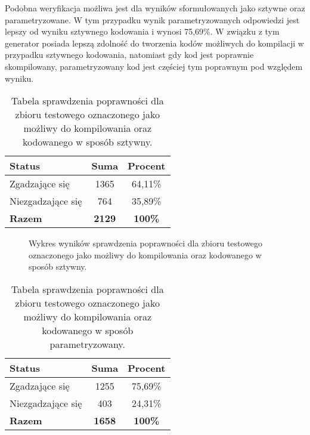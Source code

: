 Podobna weryfikacja możliwa jest dla wyników sformułowanych jako sztywne oraz parametryzowane. W tym przypadku wynik parametryzowanych odpowiedzi jest lepszy od wyniku sztywnego kodowania i wynosi 75,69\%. W związku z tym generator posiada lepszą zdolność do tworzenia kodów możliwych do kompilacji w przypadku sztywnego kodowania, natomiast gdy kod jest poprawnie skompilowany, parametryzowany kod jest częściej tym poprawnym pod względem wyniku.

\begin{table}[ht]
\caption{Tabela sprawdzenia poprawności dla zbioru testowego oznaczonego jako możliwy do kompilowania oraz kodowanego w sposób sztywny.}\label{tab:tabela8}
\centering%
\begin{tabular}{|l|c|c|}
\hline
\textbf{Status} & \textbf{Suma} & \textbf{Procent} \\
\hline
Zgadzające się & 1365 & 64,11\% \\
\hline
Niezgadzające się & 764 & 35,89\% \\
\hline
\textbf{Razem} & \textbf{2129} & \textbf{100\%} \\
\hline
\end{tabular}
\end{table}

\begin{figure}[H]
\centering
{}
\caption{Wykres wyników sprawdzenia poprawności dla zbioru testowego oznaczonego jako możliwy do kompilowania oraz kodowanego w sposób sztywny.}\label{rys:plama2h}
\end{figure}

\begin{table}[ht]
\caption{Tabela sprawdzenia poprawności dla zbioru testowego oznaczonego jako możliwy do kompilowania oraz kodowanego w sposób parametryzowany.}\label{tab:tabela9}
\centering%
\begin{tabular}{|l|c|c|}
\hline
\textbf{Status} & \textbf{Suma} & \textbf{Procent} \\
\hline
Zgadzające się & 1255 & 75,69\% \\
\hline
Niezgadzające się & 403 & 24,31\% \\
\hline
\textbf{Razem} & \textbf{1658} & \textbf{100\%} \\
\hline
\end{tabular}
\end{table}

